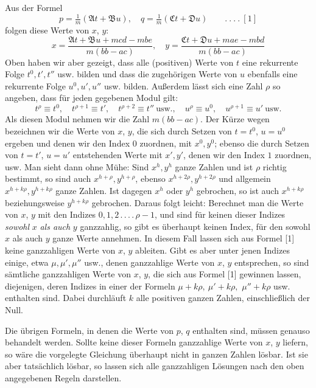 Aus der Formel
\[
p=\tfrac{1}{m}(\mathfrak{A}t+\mathfrak{B}u),\quad
q=\tfrac{1}{m}(\mathfrak{C}t+\mathfrak{D}u)\qquad .\ .\ .\ .\ [1]
\]
folgen diese Werte von $x$, $y$:
\[
x=\frac{\mathfrak{A}t+\mathfrak{B}u+mcd-mbe}{m(bb-ac)},\quad
y=\frac{\mathfrak{C}t+\mathfrak{D}u+mae-mbd}{m(bb-ac)}
\]
Oben haben wir aber gezeigt, dass alle (positiven) Werte von $t$ eine rekurrente Folge $t^0,t',t''$ usw. bilden und dass die zugehörigen Werte von $u$ ebenfalls eine rekurrente Folge $u^0,u',u''$ usw. bilden. Außerdem lässt sich eine Zahl $\rho$ so angeben, dass für jeden gegebenen Modul gilt:
\[
t^\rho\equiv t^0,\quad t^{\rho+1}\equiv t',\quad t^{\rho+2}\equiv t''\ \text{usw.},\quad
u^\rho\equiv u^0,\quad u^{\rho+1}\equiv u'\ \text{usw.}
\]
Als diesen Modul nehmen wir die Zahl $m(bb-ac)$. Der Kürze wegen bezeichnen wir die Werte von $x$, $y$, die sich durch Setzen von $t=t^0$, $u=u^0$ ergeben und denen wir den Index $0$ zuordnen, mit $x^0,y^0$; ebenso die durch Setzen von $t=t'$, $u=u'$ entstehenden Werte mit $x',y'$, denen wir den Index $1$ zuordnen, usw. Man sieht dann ohne Mühe: Sind $x^h,y^h$ ganze Zahlen und ist $\rho$ richtig bestimmt, so sind auch $x^{h+\rho},y^{h+\rho}$, ebenso $x^{h+2\rho},y^{h+2\rho}$ und allgemein $x^{h+k\rho},y^{h+k\rho}$ ganze Zahlen. Ist dagegen $x^h$ oder $y^h$ gebrochen, so ist auch $x^{h+k\rho}$ beziehungsweise $y^{h+k\rho}$ gebrochen. Daraus folgt leicht: Berechnet man die Werte von $x$, $y$ mit den Indizes $0,1,2\,.\,.\,.\,.\,\rho-1$, und sind für keinen dieser Indizes \textit{sowohl} $x$ \textit{als auch} $y$ ganzzahlig, so gibt es überhaupt keinen Index, für den sowohl $x$ als auch $y$ ganze Werte annehmen. In diesem Fall lassen sich aus Formel [1] keine ganzzahligen Werte von $x$, $y$ ableiten. Gibt es aber unter jenen Indizes einige, etwa $\mu,\mu',\mu''$ usw., denen ganzzahlige Werte von $x$, $y$ entsprechen, so sind sämtliche ganzzahligen Werte von $x$, $y$, die sich aus Formel [1] gewinnen lassen, diejenigen, deren Indizes in einer der Formeln $\mu+k\rho,\ \mu'+k\rho,$
$\mu''+k\rho$ usw. enthalten sind. Dabei durchläuft $k$ alle positiven ganzen Zahlen, einschließlich der Null.

Die übrigen Formeln, in denen die Werte von $p$, $q$ enthalten sind, müssen genauso behandelt werden. Sollte keine dieser Formeln ganzzahlige Werte von $x$, $y$ liefern, so wäre die vorgelegte Gleichung überhaupt nicht in ganzen Zahlen lösbar. Ist sie aber tatsächlich lösbar, so lassen sich alle ganzzahligen Lösungen nach den oben angegebenen Regeln darstellen.

